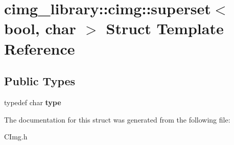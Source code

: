 \hypertarget{structcimg__library_1_1cimg_1_1superset_3_01bool_00_01char_01_4}{\section{cimg\-\_\-library\-:\-:cimg\-:\-:superset$<$ bool, char $>$ Struct Template Reference}
\label{structcimg__library_1_1cimg_1_1superset_3_01bool_00_01char_01_4}
}
\subsection*{Public Types}
\begin{DoxyCompactItemize}
\item 
\hypertarget{structcimg__library_1_1cimg_1_1superset_3_01bool_00_01char_01_4_ad92665a0e6b10373b7486b9397a13d89}{typedef char {\bfseries type}}\label{structcimg__library_1_1cimg_1_1superset_3_01bool_00_01char_01_4_ad92665a0e6b10373b7486b9397a13d89}

\end{DoxyCompactItemize}


The documentation for this struct was generated from the following file\-:\begin{DoxyCompactItemize}
\item 
C\-Img.\-h\end{DoxyCompactItemize}
